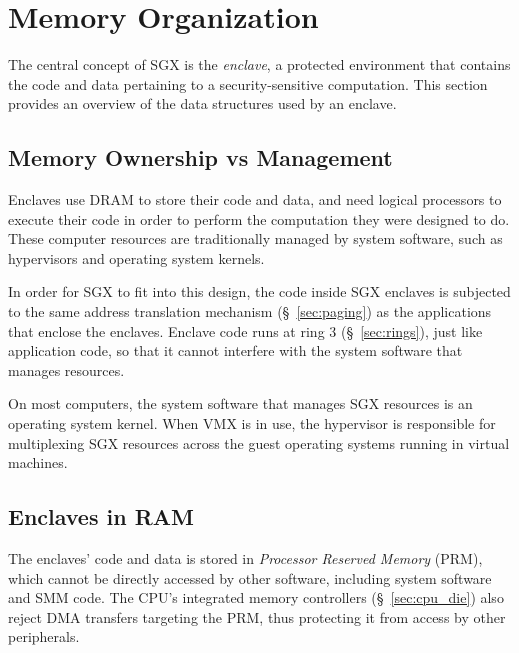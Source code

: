 \section{Memory Organization}
\label{sec:memory}

The central concept of SGX is the \textit{enclave}, a protected environment
that contains the code and data pertaining to a security-sensitive computation.
This section provides an overview of the data structures used by an enclave.


\subsection{Memory Ownership vs Management}


Enclaves use DRAM to store their code and data, and need logical processors to
execute their code in order to perform the computation they were designed to
do. These computer resources are traditionally managed by system software,
such as hypervisors and operating system kernels.

In order for SGX to fit into this design, the code inside SGX enclaves is
subjected to the same address translation mechanism (\S~\ref{sec:paging}) as
the applications that enclose the enclaves. Enclave code runs at ring 3
(\S~\ref{sec:rings}), just like application code, so that it cannot
interfere with the system software that manages resources.


On most computers, the system software that manages SGX resources is an
operating system kernel. When VMX is in use, the hypervisor is responsible for
multiplexing SGX resources across the guest operating systems running in
virtual machines.


\subsection{Enclaves in RAM}
\label{sec:prm}


The enclaves' code and data is stored in \textit{Processor Reserved Memory}
(PRM), which cannot be directly accessed by other software, including system
software and SMM code. The CPU's integrated memory controllers
(\S~\ref{sec:cpu_die}) also reject DMA transfers targeting the PRM, thus
protecting it from access by other peripherals.

